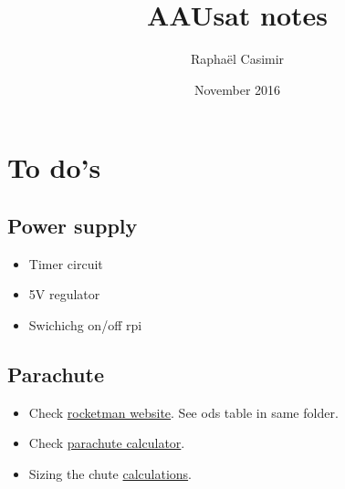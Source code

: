 \documentclass{article}
\title{AAUsat notes}
\author{Raphaël Casimir}
\date{November 2016}
\begin{document}
\maketitle

\section{To do's}
\subsection{Power supply}

\begin{itemize}
	\item Timer circuit
	\item 5V regulator
	\item Swichichg on/off rpi
\end{itemize}

\subsection{Parachute}

\begin{itemize}
	\item Check \href{http://www.the-rocketman.com/recovery.html}{rocketman website}. See ods table in same folder.
	\item Check \href{http://www.rocketreviews.com/index.php}{parachute calculator}.
	\item Sizing the chute \href{https://www.webpages.uidaho.edu/dl2/on_target/tv.htm}{calculations}.
\end{itemize}
\end{document}
